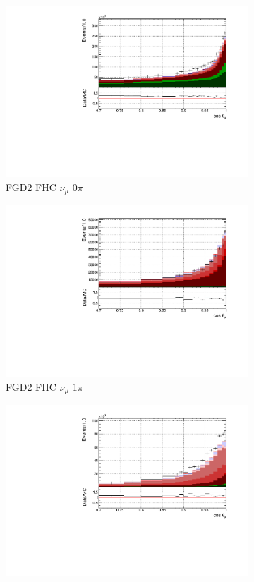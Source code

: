 \begin{figure}
\begin{subfigure}{.32\textwidth}
  \includegraphics[width=0.95\linewidth]{figs/FGD2_numuCC_0pi_t}
  \caption{FGD2 FHC $\nu_{\mu}$ 0$\pi$}
  \label{fig:tstack_FGD2_numuCC_0pi}
\end{subfigure}
\begin{subfigure}{.32\textwidth}
  \centering
  \includegraphics[width=0.95\linewidth]{figs/FGD2_numuCC_1pi_t}
  \caption{FGD2 FHC $\nu_{\mu}$ 1$\pi$}
  \label{fig:tstack_FGD2_numuCC_1pi}
\end{subfigure}
\begin{subfigure}{.32\textwidth}
  \centering
  \includegraphics[width=0.95\linewidth]{figs/FGD2_numuCC_other_t}

\end{subfigure}
\end{figure}
